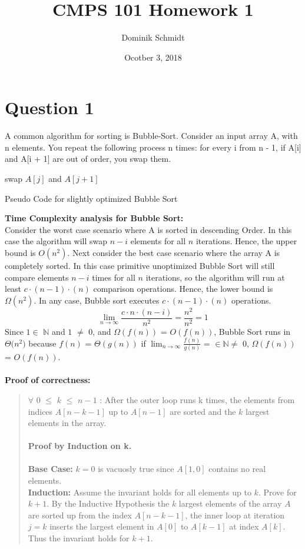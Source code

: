 \documentclass{article}
\title{CMPS 101 Homework 1}
\author{Dominik Schmidt}
\date{Ocotber 3, 2018}
\begin{document}
\maketitle

\section*{Question 1}
 A common algorithm for sorting is Bubble-Sort. Consider an input array A, with n elements. You repeat the following process n times: for every i from n - 1, if A[i] and A[i + 1] are out of order, you swap them.\\

\begin{algorithm}
\begin{algorithmic}
			\STATE swap $A[j]$ and $A[j + 1]$
		\ENDIF
	\ENDFOR
\ENDFOR
\end{algorithmic}
\caption{Pseudo Code for slightly optimized Bubble Sort}
\end{algorithm}

\textbf{Time Complexity analysis for Bubble Sort:}\\
Consider the worst case scenario where A is sorted in descending Order. In this case the algorithm will swap $n-i$ elements for all $n$ iterations. Hence, the upper bound is $O(n^2)$. Next consider the best case scenario where the array A is completely sorted. In this case primitive unoptimized Bubble Sort will still compare elements $n- i$ times for all $n$ iterations, so the algorithm will run at least $c \cdot (n - 1) \cdot (n)$ comparison operations. Hence, the lower bound is $\Omega(n^2)$. In any
case, Bubble sort executes $c \cdot (n - 1) \cdot (n)$ operations. $$\lim_{n\to\infty} \frac{c\cdot n \cdot(n - i)}{n^2} = \frac{n^2}{n^2}= 1$$
Since $1 \in $ $\mathbb{N}$ and $1$ $\neq$ 0, and $\Omega(f(n))$ = $O(f(n))$, Bubble Sort runs in $\Theta{({n^2)}}$ because $f(n)$ = $\Theta{(g(n))}$ if $\lim_{n\to\infty} \frac{f(n)}{g(n)}$ = $ \in \mathbb{N} \neq$ 0,  $\Omega(f(n))$ = $O(f(n))$.\\
\\\textbf{Proof of correctness:}
\begin{quote}
$\forall$ $0$ $\leq$ $k$ $\leq$ $n - 1$ : After the outer loop runs k times, the elements from indices $A[n - k - 1]$ up to $A[n - 1]$ are sorted and the $k$ largest elements in the array. \\\\
\textbf{Proof by Induction on k.}\\\\
\textbf{Base Case:} $k = 0$ is vacuosly true since $A[1, 0]$ contains no real elements. \\
\textbf{Induction:} Assume the invariant holds for all elements up to $k$. Prove for $k + 1$. By the Inductive Hypothesis the $k$ largest elements of the array $A$ are sorted up from the index $A[n - k - 1]$, the inner loop at iteration $j = k$ inserts the largest element in $A[0]$ to $A[k - 1]$ at index $A[k]$. Thus the invariant holds for $k + 1$.
\end{quote}
\end{document}
